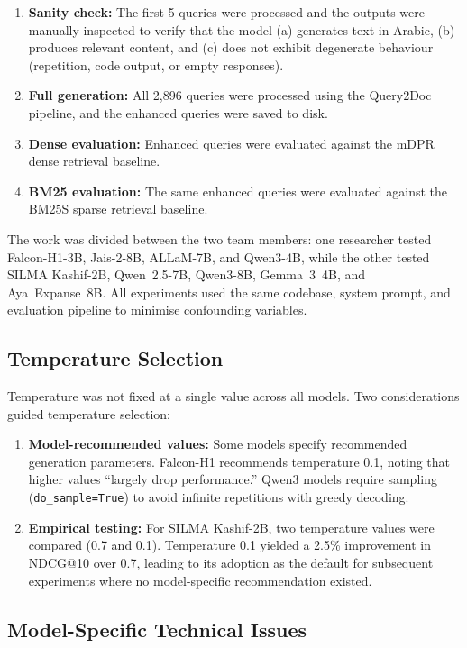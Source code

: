 \begin{enumerate}
    \item \textbf{Sanity check:} The first 5 queries were processed and the outputs were manually inspected to verify that the model (a) generates text in Arabic, (b) produces relevant content, and (c) does not exhibit degenerate behaviour (repetition, code output, or empty responses).
    \item \textbf{Full generation:} All 2,896 queries were processed using the Query2Doc pipeline, and the enhanced queries were saved to disk.
    \item \textbf{Dense evaluation:} Enhanced queries were evaluated against the mDPR dense retrieval baseline.
    \item \textbf{BM25 evaluation:} The same enhanced queries were evaluated against the BM25S sparse retrieval baseline.
\end{enumerate}

The work was divided between the two team members: one researcher tested Falcon-H1-3B, Jais-2-8B, ALLaM-7B, and Qwen3-4B, while the other tested SILMA Kashif-2B, Qwen~2.5-7B, Qwen3-8B, Gemma~3~4B, and Aya~Expanse~8B. All experiments used the same codebase, system prompt, and evaluation pipeline to minimise confounding variables.

\subsection{Temperature Selection}
\label{sec:meth_temperature}

Temperature was not fixed at a single value across all models. Two considerations guided temperature selection:

\begin{enumerate}
    \item \textbf{Model-recommended values:} Some models specify recommended generation parameters. Falcon-H1 recommends temperature 0.1, noting that higher values ``largely drop performance.'' Qwen3 models require sampling (\texttt{do\_sample=True}) to avoid infinite repetitions with greedy decoding.
    \item \textbf{Empirical testing:} For SILMA Kashif-2B, two temperature values were compared (0.7 and 0.1). Temperature 0.1 yielded a 2.5\% improvement in NDCG@10 over 0.7, leading to its adoption as the default for subsequent experiments where no model-specific recommendation existed.
\end{enumerate}

\subsection{Model-Specific Technical Issues}
\label{sec:meth_model_issues}

